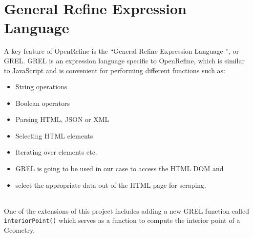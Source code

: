 \section{General Refine Expression Language}
A key feature of OpenRefine is the \textquotedblleft General Refine Expression Language \textquotedblright, or GREL.
GREL is an expression language specific to OpenRefine, which is similar to JavaScript and is convenient for performing different functions such as:
\begin{itemize}
    \item String operations
    \item Boolean operators
    \item Parsing HTML, JSON or XML
    \item Selecting HTML elements
    \item Iterating over elements etc.
    \item GREL is going to be used in our case to access the HTML DOM and
    \item select the appropriate data out of the HTML page for scraping.
\end{itemize}~\cite{OpenRefineCoreDump}\\
\newline
One of the extensions of this project includes adding a new GREL function called \texttt{interiorPoint()}
which serves as a function to compute the interior point of a Geometry.
